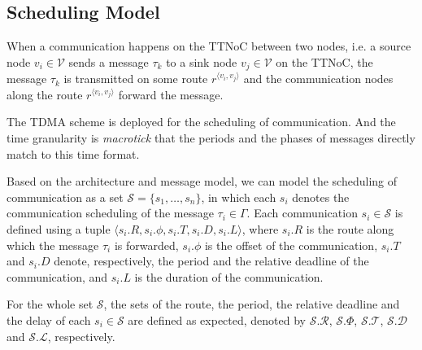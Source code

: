\documentclass[journal]{IEEEtran}
\newcommand{\calV}{\mathcal{V}}
\newcommand{\calL}{\mathcal{L}}
\newcommand{\calS}{\mathcal{S}}
\newcommand{\calR}{\mathcal{R}}
\newcommand{\calD}{\mathcal{D}}
\newcommand{\calT}{\mathcal{T}}
\newcommand{\route}[3]{#1^{\langle #2,#3\rangle}}
\begin{document}
\subsection{Scheduling Model}
\label{ss:schmodel}

When a communication happens on the TTNoC between two nodes, i.e. a
source node $v_i\in \calV$ sends a message $\tau_{k}$ to a sink node
$v_j\in \calV$ on the TTNoC, the message $\tau_k$ is transmitted on
some route $\route{r}{v_i}{v_j}$ and the communication nodes along the
route $\route{r}{v_i}{v_j}$ forward the message.

The TDMA scheme is deployed for the scheduling of communication.  And
the time granularity is \emph{macrotick} that the periods and the
phases of messages directly match to this time format.

Based on the architecture and message model, we can model the scheduling of communication as a set $\calS=\{s_1,\ldots,s_n\}$, in which each
$s_{i}$ denotes the communication scheduling of the message
$\tau_{i}\in\Gamma$. Each communication $s_{i}\in\calS$ is defined
using a tuple $\langle s_i.R, s_i.\phi, s_i.T, s_i.D, s_i.L\rangle$,
where $s_i.R$ is the route along which the message $\tau_i$ is
forwarded, 
$s_i.\phi$ is the offset of the communication, $s_i.T$ and
$s_i.D$ denote, 
respectively, 
the period and the relative deadline of the communication, and $s_i.L$ is the duration of the communication.

For the whole set $\calS$, the sets of the route, the period, the
relative deadline and the delay of each $s_i\in\calS$ are defined as
expected, denoted by $\calS.\calR$, $\calS.\Phi$, $\calS.\calT$,
$\calS.\calD$ and $\calS.\calL$, respectively.

\end{document}
